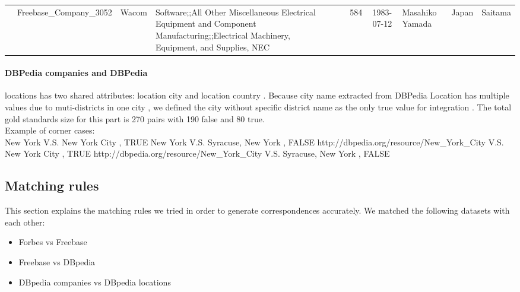 \begin{table}[H]
\begin{tabular}{llllrrclcc}
                  & Freebase\_Company\_3052                 & Wacom                                        & Software;;All Other Miscellaneous Electrical Equipment and Component Manufacturing;;Electrical Machinery, Equipment, and Supplies, NEC &                                      & 584                                            & 1983-07-12           & Masahiko Yamada                                    & Japan                                                 & Saitama                                               
\end{tabular}
\end{table}

\paragraph{DBPedia companies and DBPedia} locations has two shared attributes: location city and location country . Because city name extracted from DBPedia Location has multiple values due to muti-districts in one city , we defined the city without specific district name as the only true value for integration . The total gold standards size for this part is 270 pairs with 190 false and 80 true.\\
Example of corner cases: \\
New York V.S. New York City , TRUE
New York V.S. Syracuse, New York , FALSE
http://dbpedia.org/resource/New\_York\_City V.S. New York City , TRUE
http://dbpedia.org/resource/New\_York\_City V.S. Syracuse, New York , FALSE


\newpage
\subsection{Matching rules}
This section explains the matching rules we tried in order to generate correspondences accurately. We matched the following datasets with each other:
\begin{itemize}[noitemsep,topsep=0pt,parsep=0pt,partopsep=0pt]
\item Forbes vs Freebase
\item Freebase vs DBpedia
\item DBpedia companies vs DBpedia locations
\end{itemize}


